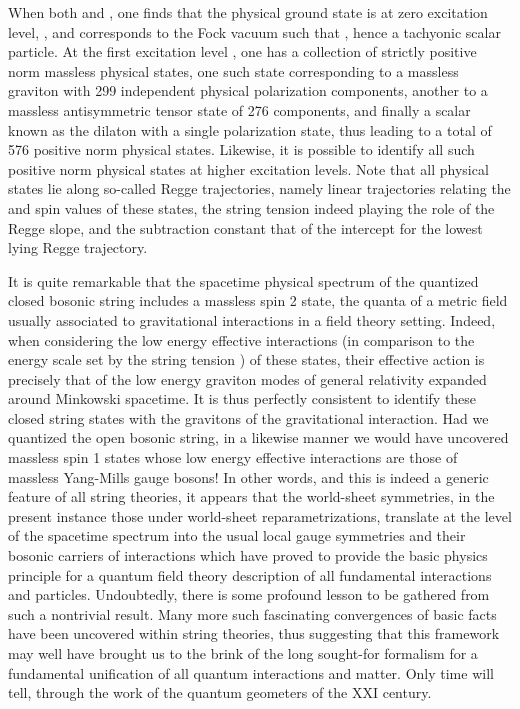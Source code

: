 \documentclass[a4paper,11pt]{article}
\begin{document}
When both \coordHE{} and \coordHE{}, one finds that the physical 
ground state is at zero excitation level, \coordHE{}, and corresponds
to the Fock vacuum \coordHE{} such that \coordHE{}, hence a
tachyonic scalar particle. At the first excitation level \coordHE{},
one has a collection of strictly positive norm massless physical states,
one such state corresponding to a massless graviton with 299 independent
physical polarization components, another to a massless antisymmetric
tensor state of 276 components, and finally a scalar known as the dilaton
with a single polarization state, thus leading to a total of 576 positive norm
physical states. Likewise, it is possible to identify all such positive
norm physical states at higher excitation levels. Note that all physical
states lie along so-called Regge trajectories, namely linear trajectories
relating the \coordHE{} and spin values of these states, the string tension
\coordHE{} indeed playing the role of the Regge slope, and the subtraction
constant \coordHE{} that of the intercept for the lowest lying Regge trajectory.

It is quite remarkable that the spacetime physical spectrum
of the quantized closed bosonic string includes a massless spin 2 state,
the quanta of a metric field usually associated to gravitational interactions
in a field theory setting. Indeed, when considering the low energy effective
interactions (in comparison to the energy scale set by the string tension
\coordHE{}) of these states, their effective action is precisely that of
the low energy graviton modes of ge\-ne\-ral relativity expanded around 
Minkowski spacetime.\cite{Pol,GSW} It is thus perfectly consistent to 
identify these
closed string states with the gravitons of the gra\-vi\-ta\-tio\-nal 
interaction. Had we quantized the open bosonic string, in a likewise manner 
we would have uncovered massless spin 1 states whose low energy effective 
interactions are those of massless Yang-Mills gauge bosons! In other words, 
and this is indeed a generic feature of all string theories, it appears that 
the world-sheet symmetries, in the present instance those under world-sheet
reparametrizations, translate at the level of the spacetime spectrum into
the usual local gauge symmetries and their bosonic carriers of interactions
which have proved to provide the basic physics principle for a quantum
field theory description of all fundamental interactions and particles.
Undoubtedly, there is some profound lesson to be gathered from such a
nontrivial result. Many more such fascinating convergences of basic facts
have been uncovered within string theories, thus suggesting that this 
framework may well have brought us to the brink of the long sought-for 
formalism for a fundamental unification of all quantum interactions and 
matter. Only time will tell, through the work of the quantum geometers of 
the XXI\coordHE{} century.
\end{document}
